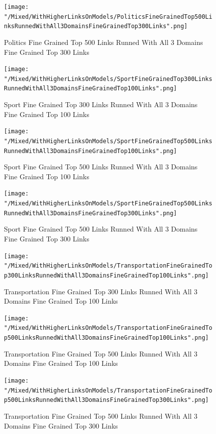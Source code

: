 \documentclass[thesis=M,english]{FITthesis}[2018/05/30]
\begin{document}
	\begin{figure}[H]\centering
		\texttt{[image: "/Mixed/WithHigherLinksOnModels/PoliticsFineGrainedTop500LinksRunnedWithAll3DomainsFineGrainedTop300Links".png]}
		\caption{Politics Fine Grained Top 500 Links Runned With All 3 Domains Fine Grained Top 300 Links}\label{}
	\end{figure}
	
	\begin{figure}[H]\centering
		\texttt{[image: "/Mixed/WithHigherLinksOnModels/SportFineGrainedTop300LinksRunnedWithAll3DomainsFineGrainedTop100Links".png]}
		\caption{Sport Fine Grained Top 300 Links Runned With All 3 Domains Fine Grained Top 100 Links}\label{}
	\end{figure}
	
	\begin{figure}[H]\centering
		\texttt{[image: "/Mixed/WithHigherLinksOnModels/SportFineGrainedTop500LinksRunnedWithAll3DomainsFineGrainedTop100Links".png]}
		\caption{Sport Fine Grained Top 500 Links Runned With All 3 Domains Fine Grained Top 100 Links}\label{}
	\end{figure}
	
	\begin{figure}[H]\centering
		\texttt{[image: "/Mixed/WithHigherLinksOnModels/SportFineGrainedTop500LinksRunnedWithAll3DomainsFineGrainedTop300Links".png]}
		\caption{Sport Fine Grained Top 500 Links Runned With All 3 Domains Fine Grained Top 300 Links}\label{}
	\end{figure}


	\begin{figure}[H]\centering
		\texttt{[image: "/Mixed/WithHigherLinksOnModels/TransportationFineGrainedTop300LinksRunnedWithAll3DomainsFineGrainedTop100Links".png]}
		\caption{Transportation Fine Grained Top 300 Links Runned With All 3 Domains Fine Grained Top 100 Links}\label{}
	\end{figure}	

	\begin{figure}[H]\centering
		\texttt{[image: "/Mixed/WithHigherLinksOnModels/TransportationFineGrainedTop500LinksRunnedWithAll3DomainsFineGrainedTop100Links".png]}
		\caption{Transportation Fine Grained Top 500 Links Runned With All 3 Domains Fine Grained Top 100 Links}\label{}
	\end{figure}	

	\begin{figure}[H]\centering
		\texttt{[image: "/Mixed/WithHigherLinksOnModels/TransportationFineGrainedTop500LinksRunnedWithAll3DomainsFineGrainedTop300Links".png]}
		\caption{Transportation Fine Grained Top 500 Links Runned With All 3 Domains Fine Grained Top 300 Links}\label{}
	\end{figure}			
	
\end{document}
